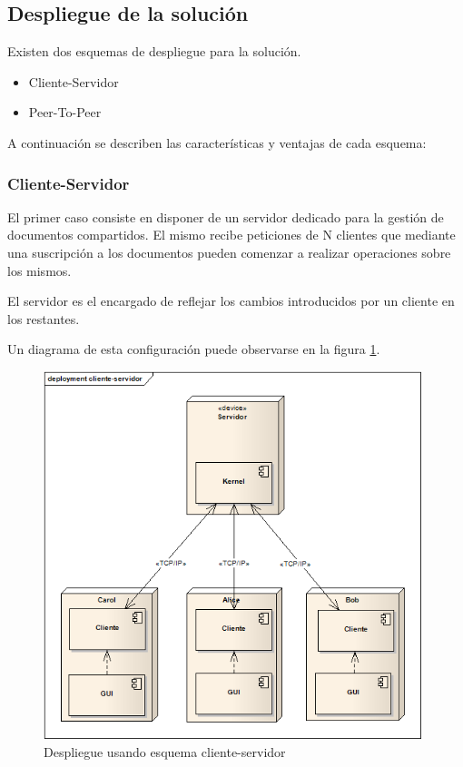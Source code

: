 \documentclass[12pt,a4paper]{article}
\begin{document}
\subsection{Despliegue de la solución}
Existen dos esquemas de despliegue para la solución.

\begin{itemize}
\item Cliente-Servidor
\item Peer-To-Peer
\end{itemize}

A continuación se describen las características y ventajas de cada esquema:

\subsubsection{Cliente-Servidor}
El primer caso consiste en disponer de un servidor dedicado para la gestión de documentos compartidos. El mismo recibe
peticiones de N clientes que mediante una suscripción a los documentos pueden comenzar a realizar operaciones sobre los mismos.

El servidor es el encargado de reflejar los cambios introducidos por un cliente en los restantes.

Un diagrama de esta configuración puede observarse en la figura \ref{cliente-servidor}.

	\begin{figure}[!ht]
		\begin{center}
			\includegraphics[width=11cm]{cliente-servidor.png}
			\caption{\label{cliente-servidor} Despliegue usando esquema cliente-servidor }
		\end{center}
	\end{figure}
\end{document}
